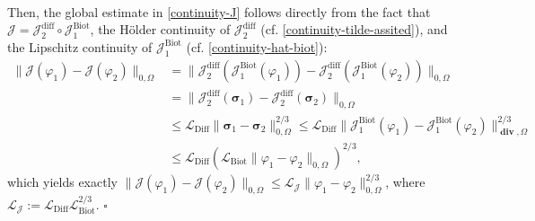 \documentclass[fleqn,a4paper]{cas-sc}
\newcommand\bdiv{\mathop{\mathbf{div}}\nolimits}
\newcommand{\0}{\boldsymbol{0}}
\newcommand\cJ{\mathcal{J}}
\newcommand\bsigma{\boldsymbol{\sigma}}
\numberwithin{equation}{section}
\numberwithin{figure}{section}
\newenvironment{proof}{\noindent{\it Proof.}}{\hfill$\square$}
\begin{document}
\begin{proof}
\begin{align}
\end{align}
Then, the global estimate in \eqref{continuity-J} follows directly from the fact that $\mathcal{J} = \cJ_{2}^{\mathrm{diff}} \circ \cJ_{1}^{\mathrm{Biot}}$, the Hölder continuity of $\cJ_{2}^{\mathrm{diff}}$ (cf. \eqref{continuity-tilde-assited}), and the Lipschitz continuity of $\cJ_{1}^{\mathrm{Biot}}$ (cf. \eqref{continuity-hat-biot}):
\begin{align*}
    \|\mathcal{J}(\varphi_{1})-\mathcal{J}(\varphi_{2})\|_{0,\Omega} 
    &= \|\cJ_{2}^{\mathrm{diff}}(\cJ_{1}^{\mathrm{Biot}}(\varphi_{1})) - \cJ_{2}^{\mathrm{diff}}(\cJ_{1}^{\mathrm{Biot}}(\varphi_{2}))\|_{0,\Omega} \\
    &= \|\cJ_{2}^{\mathrm{diff}}({\bsigma}_{1})-\cJ_{2}^{\mathrm{diff}}({\bsigma}_{2})\|_{0,\Omega} \\
    &\leq \mathcal{L}_{\mathrm{Diff}} \|{\bsigma}_{1}-{\bsigma}_{2}\|_{0, \Omega}^{2/3} 
    \leq \mathcal{L}_{\mathrm{Diff}} \|\cJ_{1}^{\mathrm{Biot}}(\varphi_{1})-\cJ_{1}^{\mathrm{Biot}}(\varphi_{2})\|_{\bdiv, \Omega}^{2/3} \\
    & \leq \mathcal{L}_{\mathrm{Diff}} \left( \mathcal{L}_{\mathrm{Biot}}\|\varphi_1 - \varphi_2\|_{0,\Omega} \right)^{2/3},
\end{align*}
which yields exactly $\|\mathcal{J}(\varphi_{1})-\mathcal{J}(\varphi_{2})\|_{0,\Omega} \leq \mathcal{L}_{\mathcal{J}} \|\varphi_1 - \varphi_2\|_{0,\Omega}^{2/3}$, where
 $\displaystyle \mathcal{L}_{\mathcal{J}}:= \mathcal{L}_{\mathrm{Diff}} \mathcal{L}_{\mathrm{Biot}}^{2/3}$.    
\end{proof}
\end{document}
